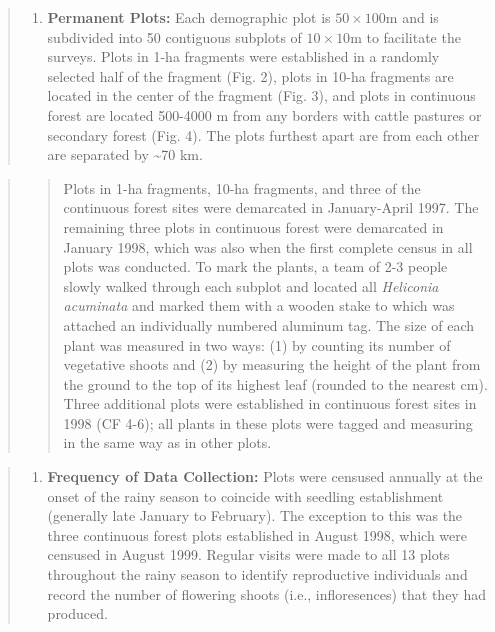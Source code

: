 \documentclass[
  12pt,
  man, donotrepeattitle,floatsintext]{apa6}
\providecommand{\tightlist}{%
  \setlength{\itemsep}{0pt}\setlength{\parskip}{0pt}}
\begin{document}
\begin{quote}
\begin{enumerate}
\def\labelenumi{\alph{enumi}.}
\setcounter{enumi}{1}
\tightlist
\item
  \textbf{Permanent Plots:} Each demographic plot is \(50\times100\)m and is subdivided into 50 contiguous subplots of \(10\times10\)m to facilitate the surveys. Plots in 1-ha fragments were established in a randomly selected half of the fragment (Fig. 2), plots in 10-ha fragments are located in the center of the fragment (Fig. 3), and plots in continuous forest are located 500-4000 m from any borders with cattle pastures or secondary forest (Fig. 4). The plots furthest apart are from each other are separated by \textasciitilde70 km.
\end{enumerate}
\end{quote}

\begin{quote}
\begin{quote}
Plots in 1-ha fragments, 10-ha fragments, and three of the continuous forest sites were demarcated in January-April 1997. The remaining three plots in continuous forest were demarcated in January 1998, which was also when the first complete census in all plots was conducted. To mark the plants, a team of 2-3 people slowly walked through each subplot and located all \emph{Heliconia acuminata} and marked them with a wooden stake to which was attached an individually numbered aluminum tag. The size of each plant was measured in two ways: (1) by counting its number of vegetative shoots and (2) by measuring the height of the plant from the ground to the top of its highest leaf (rounded to the nearest cm). Three additional plots were established in continuous forest sites in 1998 (CF 4-6); all plants in these plots were tagged and measuring in the same way as in other plots.
\end{quote}
\end{quote}

\begin{quote}
\begin{enumerate}
\def\labelenumi{\alph{enumi}.}
\setcounter{enumi}{2}
\tightlist
\item
  \textbf{Frequency of Data Collection:} Plots were censused annually at the onset of the rainy season to coincide with seedling establishment (generally late January to February). The exception to this was the three continuous forest plots established in August 1998, which were censused in August 1999. Regular visits were made to all 13 plots throughout the rainy season to identify reproductive individuals and record the number of flowering shoots (i.e., infloresences) that they had produced.
\end{enumerate}
\end{quote}
\end{document}
